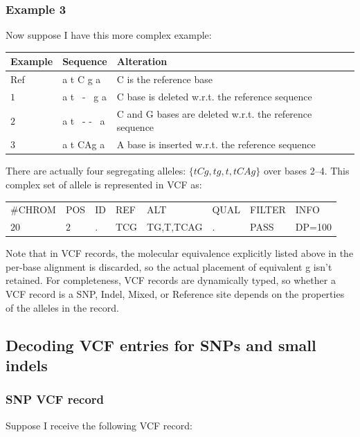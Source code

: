 \documentclass[8pt]{article}
\begin{document}
\subsubsection{Example 3}
Now suppose I have this more complex example:

\vspace{0.3cm}
\begin{tabular}{ | l | l | l | }
\hline
Example & Sequence & Alteration \\ \hline
Ref & a t C g a & C is the reference base \\ \hline
$1$   & a t \ - \ g a & C base is deleted w.r.t. the reference sequence \\ \hline
$2$   & a t \ - - \ a & C and G bases are deleted w.r.t. the reference sequence\\ \hline
$3$   & a t CAg a & A base is inserted w.r.t. the reference sequence \\ \hline
\end{tabular}

\vspace{0.3cm}
There are actually four segregating alleles: $\{tCg,tg,t,tCAg\}$ over bases 2--4.
This complex set of allele is represented in VCF as:

\vspace{0.3cm}
\begin{tabular}{ l l l l l l l l}
	\#CHROM & POS & ID & REF & ALT & QUAL & FILTER & INFO \\
	$20$ & $2$ & . & TCG & TG,T,TCAG & . & PASS & DP=100 \\
\end{tabular}
\vspace{0.3cm}

Note that in VCF records, the molecular equivalence explicitly listed above in the per-base alignment is discarded, so the actual placement of equivalent g isn't retained.
For completeness, VCF records are dynamically typed, so whether a VCF record is a SNP, Indel, Mixed, or Reference site depends on the properties of the alleles in the record.

\subsection{Decoding VCF entries for SNPs and small indels}
\subsubsection{SNP VCF record}
Suppose I receive the following VCF record:
\end{document}
